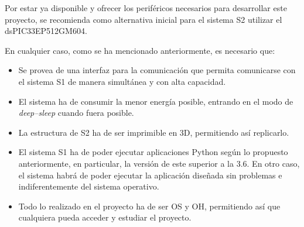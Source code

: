 Por estar ya disponible y ofrecer los periféricos
necesarios para desarrollar este proyecto, se recomienda como alternativa inicial para
el sistema \ac{S2} utilizar el dsPIC33EP512GM604.

En cualquier caso, como se ha mencionado anteriormente, es necesario que:

\begin{itemize}
    \item Se provea de una interfaz para la comunicación que permita comunicarse con el sistema \ac{S1} de manera simultánea y con alta capacidad.
    \item El sistema ha de consumir la menor energía posible, entrando en el modo de \textit{deep--sleep} cuando fuera posible.
    \item La estructura de \ac{S2} ha de ser imprimible en 3D, permitiendo así replicarlo.
    \item El sistema \ac{S1} ha de poder ejecutar aplicaciones Python según lo propuesto anteriormente, en particular, la versión de este superior a la 3.6. En otro caso, el sistema habrá de poder ejecutar la aplicación diseñada sin problemas e indiferentemente del sistema operativo.
    \item Todo lo realizado en el proyecto ha de ser \ac{OS} y \ac{OH}, permitiendo así que cualquiera pueda acceder y estudiar el proyecto.
\end{itemize}